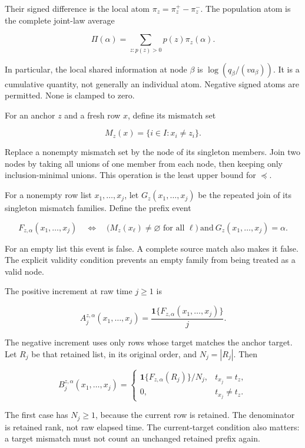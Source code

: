 Their signed difference is the local atom \(\pi_z=\pi_z^+-\pi_z^-\). The population atom is the complete joint-law average

\[
\Pi(\alpha)=\sum_{z:p(z)>0}p(z)\pi_z(\alpha).
\]

In particular, the local shared information at node \(\beta\) is \(\log(q_\beta/(v a_\beta))\). It is a cumulative quantity, not generally an individual atom. Negative signed atoms are permitted. None is clamped to zero.

\label{what-the-prefix-statistic-observes}

For an anchor \(z\) and a fresh row \(x\), define its mismatch set

\[
M_z(x)=\{i\in I:x_i\ne z_i\}.
\]

Replace a nonempty mismatch set by the node of its singleton members. Join two nodes by taking all unions of one member from each node, then keeping only inclusion-minimal unions. This operation is the least upper bound for \(\preceq\).

For a nonempty row list \(x_1,\ldots,x_j\), let \(G_z(x_1,\ldots,x_j)\) be the repeated join of its singleton mismatch families. Define the prefix event

\[
F_{z,\alpha}(x_1,\ldots,x_j)
\quad\Longleftrightarrow\quad
\bigl(M_z(x_\ell)\ne\varnothing\text{ for all }\ell\bigr)
\ \text{and}\ G_z(x_1,\ldots,x_j)=\alpha.
\]

For an empty list this event is false. A complete source match also makes it false. The explicit validity condition prevents an empty family from being treated as a valid node.

The positive increment at raw time \(j\ge1\) is

\[
A_j^{z,\alpha}(x_1,\ldots,x_j)
=\frac{\mathbf1\{F_{z,\alpha}(x_1,\ldots,x_j)\}}{j}.
\]

The negative increment uses only rows whose target matches the anchor target. Let \(R_j\) be that retained list, in its original order, and \(N_j=|R_j|\). Then

\[
B_j^{z,\alpha}(x_1,\ldots,x_j)=
\begin{cases}
\mathbf1\{F_{z,\alpha}(R_j)\}/N_j,&t_{x_j}=t_z,\\
0,&t_{x_j}\ne t_z.
\end{cases}
\]

The first case has \(N_j\ge1\), because the current row is retained. The denominator is retained rank, not raw elapsed time. The current-target condition also matters: a target mismatch must not count an unchanged retained prefix again.

